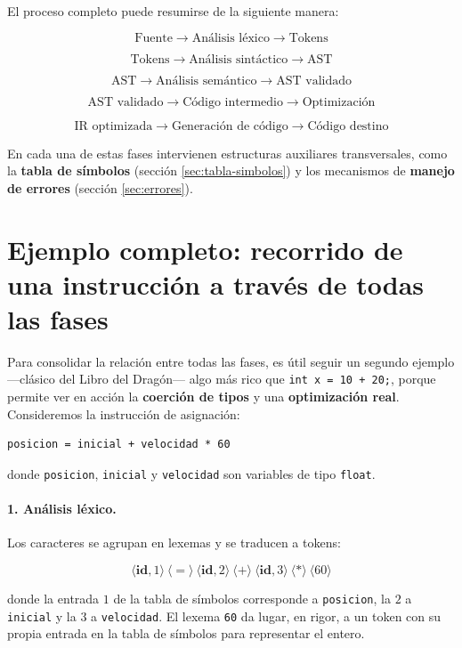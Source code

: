 \documentclass[11pt,a4paper]{article}
\begin{document}
El proceso completo puede resumirse de la siguiente manera:

\[
\boxed{
\text{Fuente}
\rightarrow
\text{Análisis léxico}
\rightarrow
\text{Tokens}
}
\]

\[
\boxed{
\text{Tokens}
\rightarrow
\text{Análisis sintáctico}
\rightarrow
\text{AST}
}
\]

\[
\boxed{
\text{AST}
\rightarrow
\text{Análisis semántico}
\rightarrow
\text{AST validado}
}
\]

\[
\boxed{
\text{AST validado}
\rightarrow
\text{Código intermedio}
\rightarrow
\text{Optimización}
}
\]

\[
\boxed{
\text{IR optimizada}
\rightarrow
\text{Generación de código}
\rightarrow
\text{Código destino}
}
\]

En cada una de estas fases intervienen estructuras auxiliares transversales, como la
\textbf{tabla de símbolos} (sección \ref{sec:tabla-simbolos}) y los mecanismos de \textbf{manejo
de errores} (sección \ref{sec:errores}).

\section{Ejemplo completo: recorrido de una instrucción a través de todas las fases}
\label{sec:ejemplo-completo}

Para consolidar la relación entre todas las fases, es útil seguir un segundo ejemplo —clásico
del Libro del Dragón— algo más rico que \texttt{int x = 10 + 20;}, porque permite ver en acción
la \textbf{coerción de tipos} y una \textbf{optimización real}. Consideremos la instrucción de
asignación:

\begin{lstlisting}
posicion = inicial + velocidad * 60
\end{lstlisting}

donde \texttt{posicion}, \texttt{inicial} y \texttt{velocidad} son variables de tipo
\texttt{float}.

\paragraph{1. Análisis léxico.} Los caracteres se agrupan en lexemas y se traducen a tokens:

\[
\langle \mathbf{id}, 1\rangle\ \langle = \rangle\ \langle \mathbf{id}, 2\rangle\ \langle +
\rangle\ \langle \mathbf{id}, 3\rangle\ \langle * \rangle\ \langle 60 \rangle
\]

donde la entrada $1$ de la tabla de símbolos corresponde a \texttt{posicion}, la $2$ a
\texttt{inicial} y la $3$ a \texttt{velocidad}. El lexema \texttt{60} da lugar, en rigor, a un
token con su propia entrada en la tabla de símbolos para representar el entero.
\end{document}
